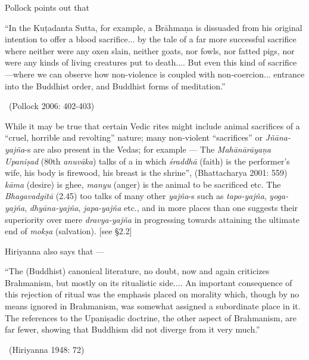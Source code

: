 Pollock points out that

\begin{myquote}
“In the Kuṭadanta Sutta, for example, a Brāhmaṇa is dissuaded from his original intention to offer a blood sacrifice... by the tale of a far more successful sacrifice where neither were any oxen slain, neither goats, nor fowls, nor fatted pigs, nor were any kinds of living creatures put to death.... But even this kind of sacrifice—where we can observe how non-violence is coupled with non-coercion... entrance into the Buddhist order, and Buddhist forms of meditation.” 

~\hfill (Pollock 2006: 402-403)
\end{myquote}

While it may be true that certain Vedic rites might include animal sacrifices of a “cruel, horrible and revolting” nature; many non-violent “sacrifices” or \textit{Jñāna-yajña}-s are also present in the Vedas; for example — The \textit{Mahānārāyaṇa Upaniṣad} (80th \textit{anuvāka}) talks of a  in which \textit{śraddhā} (faith) is the performer’s wife, his body is firewood, his breast is the shrine”, (Bhattacharya 2001: 559) \textit{kāma }(desire) is ghee, \textit{manyu} (anger) is the animal to be sacrificed etc. The \textit{Bhagavadgītā} (2.45) too talks of many other \textit{yajña}-s such as \textit{tapo-yajña}, \textit{yoga-yajña}, \textit{dhyāna-yajña}, \textit{japa-yajña} etc., and in more places than one suggests their superiority over mere \textit{dravya-yajña} in progressing towards attaining the ultimate end of \textit{mokṣa} (salvation). [see §2.2]

Hiriyanna also says that —

\begin{myquote}
“The (Buddhist) canonical literature, no doubt, now and again criticizes Brahmanism, but mostly on its ritualistic side.... An important consequence of this rejection of ritual was the emphasis placed on morality which, though by no means ignored in Brahmanism, was somewhat assigned a subordinate place in it. The references to the Upaniṣadic doctrine, the other aspect of Brahmanism, are far fewer, showing that Buddhism did not diverge from it very much.” 

~\hfill (Hiriyanna 1948: 72)
\end{myquote}

